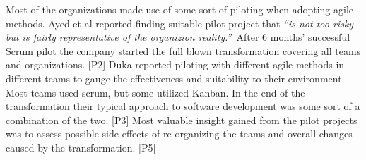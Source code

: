 Most of the organizations made use of some sort of piloting when
adopting agile methods. Ayed et al reported finding suitable pilot
project that \textit{``is not too risky but is fairly representative
of the organizion reality.''} After 6 months' successful Scrum pilot
the company started the full blown transformation covering all teams
and organizations. [P2] Duka reported piloting with different agile
methods in different teams to gauge the effectiveness and suitability
to their environment. Most teams used scrum, but some utilized Kanban.
In the end of the transformation their typical approach to software
development was some sort of a combination of the two. [P3] Most
valuable insight gained from the pilot projects was to assess possible
side effects of re-organizing the teams and overall changes caused by
the transformation. [P5]
